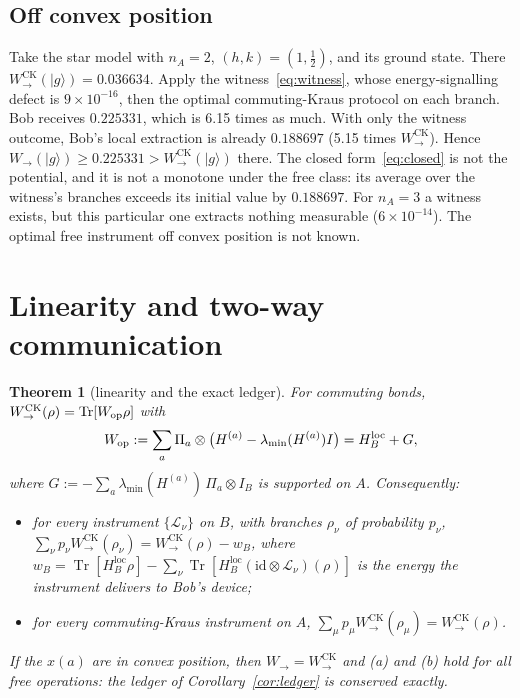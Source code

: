 \documentclass[aps,pra,twocolumn,reprint,superscriptaddress,nofootinbib,floatfix]{revtex4-2}
\theoremstyle{plain}
\newtheorem{theorem}{Theorem}
\theoremstyle{remark}
\newcommand{\Tr}{\operatorname{Tr}}
\newcommand{\id}{\mathrm{id}}
\newcommand{\Wto}{W_{\to}}
\newcommand{\WCK}{W_{\to}^{\mathrm{CK}}}
\newcommand{\HBl}{H_B^{\mathrm{loc}}}
\newcommand{\lmin}{\lambda_{\min}}
\newcommand{\ket}[1]{|#1\rangle}
\begin{document}
\subsection{Off convex position}
\label{sec:offconvex}

Take the star model with $n_A=2$, $(h,k)=(1,\tfrac12)$, and its ground state. There
$\WCK(\ket g)=0.036634$. Apply the witness~\eqref{eq:witness}, whose energy-signalling
defect is $9\times10^{-16}$, then the optimal commuting-Kraus protocol on each branch. Bob
receives $0.225331$, which is 6.15 times as much. With only the witness outcome, Bob's local
extraction is already $0.188697$ (5.15 times $\WCK$). Hence $\Wto(\ket g)\ge0.225331>\WCK(\ket g)$
there. The closed form~\eqref{eq:closed} is not the potential, and it is not a monotone under
the free class: its average over the witness's branches exceeds its initial value by
$0.188697$. For $n_A=3$ a witness exists, but this particular one extracts nothing measurable
($6\times10^{-14}$). The optimal free instrument off convex position is not known.

\section{Linearity and two-way communication}
\label{sec:twoway}

\begin{theorem}[linearity and the exact ledger]
\label{thm:linear}
For commuting bonds, $\WCK(\rho)=\Tr[W_{\rm op}\rho]$ with
\begin{equation}
W_{\rm op}:=\sum_a\Pi_a\otimes\big(H^{(a)}-\lmin(H^{(a)})I\big)=\HBl+G ,
\label{eq:Wop}
\end{equation}
where $G:=-\sum_a\lmin(H^{(a)})\,\Pi_a\otimes I_B$ is supported on $A$. Consequently:
\begin{itemize}
\item[(a)] for every instrument $\{\mathcal L_\nu\}$ on $B$, with branches $\rho_\nu$ of
probability $p_\nu$, $\sum_\nu p_\nu\WCK(\rho_\nu)=\WCK(\rho)-w_B$, where
$w_B=\Tr[\HBl\rho]-\sum_\nu\Tr[\HBl(\id\otimes\mathcal L_\nu)(\rho)]$ is the energy the
instrument delivers to Bob's device;
\item[(b)] for every commuting-Kraus instrument on $A$,
$\sum_\mu p_\mu\WCK(\rho_\mu)=\WCK(\rho)$.
\end{itemize}
If the $x(a)$ are in convex position, then $\Wto=\WCK$ and (a) and (b) hold for all free
operations: the ledger of Corollary~\ref{cor:ledger} is conserved exactly.
\end{theorem}
\end{document}
